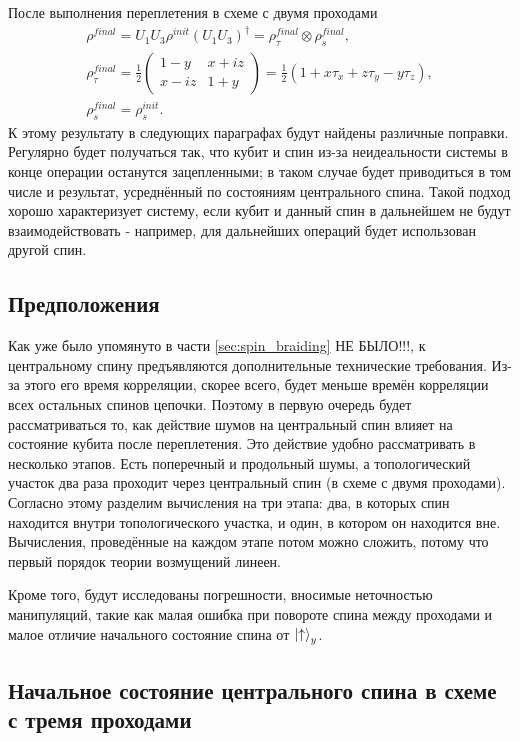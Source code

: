 \documentclass[a4paper,12pt]{article}
\theoremstyle{plain} %
\theoremstyle{definition} %
\theoremstyle{remark} %
\begin{document}
После выполнения переплетения в схеме с двумя проходами
\begin{gather}
    \rho^{final} = U_1 U_3 \rho^{init} (U_1 U_3)^\dagger = \rho^{final}_\tau \otimes \rho^{final}_s,
    \\
    \rho^{final}_\tau = \frac{1}{2}
    \begin{pmatrix}
        1 - y & x + i z \\
        x - i z & 1 + y
    \end{pmatrix} = \frac{1}{2} (1 + x \tau_x + z \tau_y - y \tau_z), 
    \label{eq:tau_final}
    \\
    \rho^{final}_s = \rho^{init}_s.
\end{gather}
К этому результату в следующих параграфах будут найдены различные поправки. Регулярно будет получаться так, что кубит и спин из-за неидеальности системы в конце операции останутся зацепленными; в таком случае будет приводиться в том числе и результат, усреднённый по состояниям центрального спина. 
Такой подход хорошо характеризует систему, если кубит и данный спин в дальнейшем не будут взаимодействовать - например, для дальнейших операций будет использован другой спин.

\subsection{Предположения}
Как уже было упомянуто в части \ref{sec:spin_braiding} {\color{red}НЕ БЫЛО!!!}, к центральному спину предъявляются дополнительные технические требования. 
Из-за этого его время корреляции, скорее всего, будет меньше времён корреляции всех остальных спинов цепочки. 
Поэтому в первую очередь будет рассматриваться то, как действие шумов на центральный спин влияет на состояние кубита после переплетения. 
Это действие удобно рассматривать в несколько этапов. 
Есть поперечный и продольный шумы, а топологический участок два раза проходит через центральный спин (в схеме с двумя проходами).
Согласно этому разделим вычисления на три этапа: два, в которых спин находится внутри топологического участка, и один, в котором он находится вне. Вычисления, проведённые на каждом этапе потом можно сложить, потому что первый порядок теории возмущений линеен.

Кроме того, будут исследованы погрешности, вносимые неточностью манипуляций, такие как малая ошибка при повороте спина между проходами и малое отличие начального состояние спина от $\ket{\uparrow}_y$.

\subsection{Начальное состояние центрального спина в схеме с тремя проходами}
\end{document}

